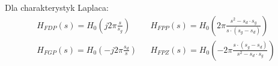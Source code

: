             \noindent
            Dla charakterystyk Laplaca:
            \begin{align*}
                H_{FDP}(s) = H_0\left( j2\pi \frac{s}{s_g}\right) && H_{FPP}(s)=H_0\left( 2\pi\frac{s^2-s_d\cdot s_g}{s\cdot(s_g-s_d)}\right)\\
                H_{FGP}(s) = H_0\left(-j2\pi \frac{s_d}{s}\right) && H_{FPZ}(s)=H_0\left(-2\pi\frac{s\cdot(s_g-s_d)}{s^2-s_d\cdot s_g}\right)
            \end{align*}
            
        